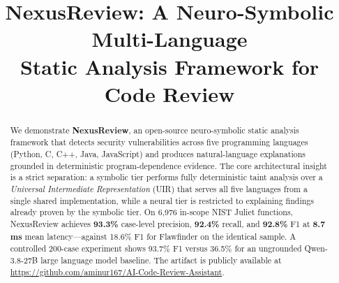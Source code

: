 \documentclass[10pt,conference]{IEEEtran}
\begin{document}
\title{NexusReview: A Neuro-Symbolic Multi-Language\\Static Analysis Framework for Code Review}

\author{
\and
{}
\and
{}
}

\maketitle

\begin{abstract}
We demonstrate \textbf{NexusReview}, an open-source neuro-symbolic
static analysis framework that detects security vulnerabilities across
five programming languages (Python, C, C++, Java, JavaScript) and
produces natural-language explanations grounded in deterministic
program-dependence evidence. The core architectural insight is a strict
separation: a symbolic tier performs fully deterministic taint analysis
over a \emph{Universal Intermediate Representation} (UIR) that serves
all five languages from a single shared implementation, while a neural
tier is restricted to explaining findings already proven by the symbolic
tier. On 6{,}976 in-scope NIST Juliet functions, NexusReview achieves
\textbf{93.3\%} case-level precision, \textbf{92.4\%} recall, and
\textbf{92.8\%} F1 at \textbf{8.7\,ms} mean latency---against 18.6\%
F1 for Flawfinder on the identical sample. A controlled 200-case
experiment shows 93.7\% F1 versus 36.5\% for an ungrounded Qwen-3.8-27B
large language model baseline.
The artifact is publicly available at
\url{https://github.com/aminur167/AI-Code-Review-Assistant}.
\end{abstract}
\end{document}
